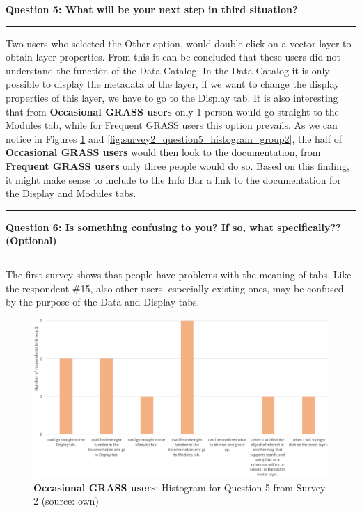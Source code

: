 \documentclass[a4paper,10pt,twoside]{article}
\begin{document}
\newpage
\noindent \textbf{Question 5:  What will be your next step in third situation?}
\par\noindent\rule{\textwidth}{0.4pt}

\noindent Two users who selected the Other option, would double-click on a vector layer to obtain layer properties. From this it can be concluded that these users did not understand the function of the Data Catalog. In the Data Catalog it is only possible to display the metadata of the layer, if we want to change the display properties of this layer, we have to go to the Display tab. It is also interesting that from \textbf{Occasional GRASS users} only 1 person would go straight to the Modules tab, while for {Frequent GRASS users} this option prevails. As we can notice in Figures \ref{fig:survey2_question5_histogram_group1} and \ref{fig:survey2_question5_histogram_group2}, the half of \textbf{Occasional GRASS users} would then look to the documentation, from \textbf{Frequent GRASS users} only three people would do so. Based on this finding, it might make sense to include to the Info Bar a link to the documentation for the Display and Modules tabs.

\par\noindent\rule{\textwidth}{0.4pt}
\noindent \textbf{Question 6: Is something confusing to you? If so, what specifically?? (Optional)}
\par\noindent\rule{\textwidth}{0.4pt}

\noindent The first survey shows that people have problems with the meaning of tabs. Like the respondent \#15, also other users, especially existing ones, may be confused by the purpose of the Data and Display tabs.

\vspace{0.3cm}
\begin{figure}[hbt!] 
\begin{center}
\includegraphics[width=17cm]{../surveys/analyzed_data/survey2_question5_histogram_group1.png} 
\caption[\textbf{Occasional GRASS users}: Histogram for Question 5 from Survey 2]{\textbf{Occasional GRASS users}: Histogram for Question 5 from Survey 2 (source: own)}
\label{fig:survey2_question5_histogram_group1}
\end{center}
\end{figure}
\end{document}
